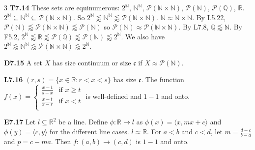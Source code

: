 \documentclass[10pt, landscape]{article}
\begin{document}
\begin{multicols*}{3}
\textbf{T7.14} These sets are equinumerous: $2^\mathbb{N}$, $\mathbb{N}^\mathbb{N}$, $\mathcal{P}(\mathbb{N} \times \mathbb{N})$, $\mathcal{P}(\mathbb{N})$, $\mathcal{P}(\mathbb{Q})$, $\mathbb{R}$. $2^\mathbb{N} \subseteq \mathbb{N}^\mathbb{N} \subseteq \mathcal{P}(\mathbb{N} \times \mathbb{N})$. So $2^\mathbb{N} \lessapprox \mathbb{N}^\mathbb{N} \lessapprox \mathcal{P}(\mathbb{N} \times \mathbb{N})$. $\mathbb{N} \approx \mathbb{N} \times \mathbb{N}$. By L5.22, $\mathcal{P}(\mathbb{N})\lessapprox \mathcal{P}(\mathbb{N} \times \mathbb{N}) \lessapprox \mathcal{P}(\mathbb{N})$ so $\mathcal{P}(\mathbb{N}) \approx \mathcal{P}(\mathbb{N} \times \mathbb{N})$. By L7.8, $\mathbb{Q} \lessapprox \mathbb{N}$. By F5.2, $2^\mathbb{N} \lessapprox \mathbb{R} \lessapprox \mathcal{P}(\mathbb{Q}) \lessapprox \mathcal{P}(\mathbb{N}) \lessapprox 2^\mathbb{N}$. We also have $2^\mathbb{N} \lessapprox \mathbb{N}^\mathbb{N} \lessapprox \mathcal{P}(\mathbb{N} \times \mathbb{N}) \lessapprox 2^\mathbb{N}$.

\textbf{D7.15} A set $X$ has size continuum or size $\mathfrak{c}$ if $X \approx \mathcal{P}(\mathbb{N})$.

\textbf{L7.16} $(r, s)=\{x \in \mathbb{R} : r < x < s\}$ has size $\mathfrak{c}$. The function $f(x) =
    \left\{
    \begin{array}{lr}
      \frac{x-t}{s-x} & \text{if $x \geq t$} \\
      \frac{x-t}{x-r} & \text{if $x < t$} \\
    \end{array}
    \right.
    $ is well-defined and $1-1$ and onto.

\textbf{E7.17} Let $l \subseteq \mathbb{R}^2$ be a line. Define $\phi:\mathbb{R}\rightarrow l$ as $\phi(x)=\langle x, mx+c\rangle$ and $\phi(y)=\langle c,y \rangle$ for the different line cases. $l \approx \mathbb{R}$. For $a < b$ and $c < d$, let $m=\frac{d-c}{b-a}$ and $p=c-ma$. Then $f:(a, b) \rightarrow (c, d)$ is $1-1$ and onto.



\end{multicols*}
\end{document}
